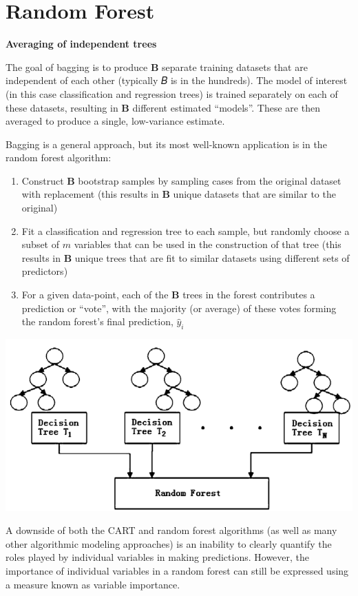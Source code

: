 \documentclass[
]{book}
\providecommand{\tightlist}{%
  \setlength{\itemsep}{0pt}\setlength{\parskip}{0pt}}
\begin{document}
\section{Random Forest}\label{random-forest}

\textbf{Averaging of independent trees}

The goal of bagging is to produce \(\boldsymbol{B}\) separate training datasets that are independent of each other (typically 𝐵 is in the hundreds). The model of interest (in this case classification and regression trees) is trained separately on each of these datasets, resulting in \(\boldsymbol{B}\) different estimated ``models''. These are then averaged to produce a single, low-variance estimate.

Bagging is a general approach, but its most well-known application is in the random forest algorithm:

\begin{enumerate}
\def\labelenumi{\arabic{enumi}.}
\tightlist
\item
  Construct \(\boldsymbol{B}\) bootstrap samples by sampling cases from the original dataset with replacement (this results in \(\boldsymbol{B}\) unique datasets that are similar to the original)
\item
  Fit a classification and regression tree to each sample, but randomly choose a subset of \(m\) variables that can be used in the construction of that tree (this results in \(\boldsymbol{B}\) unique trees that are fit to similar datasets using different sets of predictors)
\item
  For a given data-point, each of the \(\boldsymbol{B}\) trees in the forest contributes a prediction or ``vote'', with the majority (or average) of these votes forming the random forest's final prediction, \(\hat{y}_i\)
\end{enumerate}

\includegraphics[width=0.8\linewidth]{images/rf}

A downside of both the CART and random forest algorithms (as well as many other algorithmic modeling approaches) is an inability to clearly quantify the roles played by individual variables in making predictions. However, the importance of individual variables in a random forest can still be expressed using a measure known as variable importance.
\end{document}
